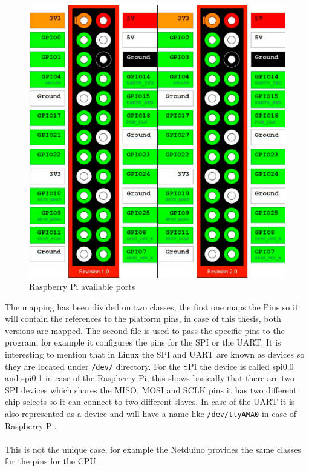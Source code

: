 \begin{figure}[H]\begin{center}
 \centering
  \captionsetup{justification=centering}
  \includegraphics[scale=0.30]{pictures/iosharp/mapping-raspberrypi}
  \caption{Raspberry Pi available ports\label{fig:mapping-rpi}}
\end{center}\end{figure}

The mapping has been divided on two classes, the first one maps the Pins so it will contain the references to the platform pins, in case of this thesis, both versions are mapped.
The second file is used to pass the specific pins to the program, for example it configures the pins for the SPI or the UART. It is interesting to mention that in Linux the SPI and UART are known as devices so they are located under \verb!/dev/! directory. For the SPI the device is called spi0.0 and spi0.1 in case of the Raspberry Pi, this shows basically that there are two SPI devices which shares the MISO, MOSI and SCLK pins it has two different chip selects so it can connect to two different slaves. In case of the UART it is also represented as a device and will have a name like \verb!/dev/ttyAMA0! in case of Raspberry Pi.
\\
\\
This is not the unique case, for example the Netduino provides the same classes for the pins for the CPU.